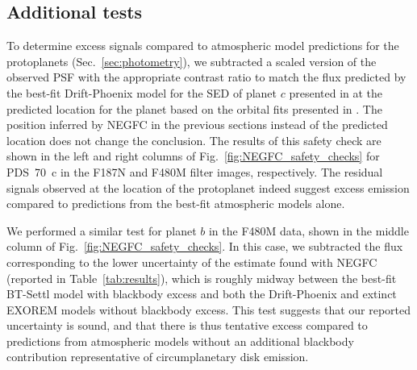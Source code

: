 \documentclass[longauth]{aa}
\begin{document}
\begin{appendix}


\subsection{Additional tests}

To determine excess signals compared to atmospheric model predictions for the protoplanets (Sec.~\ref{sec:photometry}), we subtracted a scaled version of the observed PSF with the appropriate contrast ratio to match the flux predicted by the best-fit Drift-Phoenix model for the SED of planet $c$ presented in \citet{Wang2021} at the predicted location for the planet based on the orbital fits presented in \citet{Wang2021}. The position inferred by NEGFC in the previous sections instead of the predicted location does not change the conclusion. 
The results of this safety check are shown in the left and right columns of Fig.~\ref{fig:NEGFC_safety_checks} for PDS~70~c in the F187N and F480M filter images, respectively. The residual signals observed at the location of the protoplanet indeed suggest excess emission compared to predictions from the best-fit atmospheric models alone.

We performed a similar test for planet $b$ in the F480M data, shown in the middle column of Fig.~\ref{fig:NEGFC_safety_checks}. In this case, we subtracted the flux corresponding to the lower uncertainty of the estimate found with NEGFC (reported in Table~\ref{tab:results}), which is roughly midway between the best-fit BT-Settl model with blackbody excess and both the Drift-Phoenix and extinct EXOREM models without blackbody excess. This test suggests that our reported uncertainty is sound, and that there is thus tentative excess compared to predictions from atmospheric models without an additional blackbody contribution representative of circumplanetary disk emission. %


\end{appendix}
\end{document}
